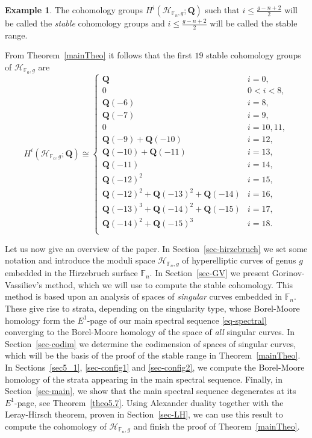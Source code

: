 \documentclass[10pt,a4paper,twoside]{amsart}
\theoremstyle{plain}
\theoremstyle{definition}
\newtheorem{exe}{Example}
\theoremstyle{remark}
\begin{document}
\begin{exe}
The cohomology groups $H^i(\mathcal{H}_{\mathbb{F}_n,g};\mathbf{Q})$ such that $i \leq \frac{g-n+2}{2}$ will be called the \emph{stable} cohomology groups and $i \leq \frac{g-n+2}{2}$ will be called the stable range. 

From Theorem~\ref{mainTheo} it follows that the first $19$ stable cohomology groups of $\mathcal{H}_{\mathbb{F}_0,g}$ are 
\begin{equation*}
H^i(\mathcal{H}_{\mathbb{F}_0,g};\mathbf{Q}) \cong \begin{cases}
\mathbf{Q}&i=0,\\
0&0<i<8,\\
\mathbf{Q}(-6)&i=8,\\
\mathbf{Q}(-7)&i=9,\\
0&i=10, 11,\\
\mathbf{Q}(-9)+\mathbf{Q}(-10)&i=12,\\
\mathbf{Q}(-10)+\mathbf{Q}(-11)&i=13,\\
\mathbf{Q}(-11)&i=14,\\
\mathbf{Q}(-12)^2&i=15,\\
\mathbf{Q}(-12)^2+\mathbf{Q}(-13)^2+\mathbf{Q}(-14)&i=16,\\
\mathbf{Q}(-13)^3+\mathbf{Q}(-14)^2+\mathbf{Q}(-15)&i=17,\\
\mathbf{Q}(-14)^2+\mathbf{Q}(-15)^3&i=18.\\
\end{cases}
\end{equation*}   
\end{exe}

Let us now give an overview of the paper. 
In Section~\ref{sec-hirzebruch} we set some notation and introduce the moduli space $\mathcal{H}_{\mathbb{F}_n,g}$ of hyperelliptic curves of genus $g$ embedded 
in the Hirzebruch surface $\mathbb{F}_n$. 
In Section~\ref{sec-GV} we present Gorinov-Vassiliev's method, which we will use to compute the stable cohomology. This method is based upon an analysis of spaces of \emph{singular} curves embedded in $\mathbb{F}_n$. These give rise to strata, depending on the singularity type, whose Borel-Moore homology form the $E^1$-page of our main spectral sequence \eqref{eq-spectral} converging to the Borel-Moore homology of the space of \emph{all} singular curves. 
In Section~\ref{sec-codim} we determine the codimension of spaces of singular curves, which will be the basis of the proof of the stable range in Theorem~\ref{mainTheo}. In Sections~\ref{sec5_1}, \ref{sec-config1} and \ref{sec-config2}, we compute the Borel-Moore homology of the strata appearing in the main spectral sequence. Finally, in Section~\ref{sec-main}, we show that the main spectral sequence degenerates at its $E^1$-page, see Theorem~\ref{theo5.7}. Using Alexander duality together with the Leray-Hirsch theorem, proven in Section~\ref{sec-LH}, we can use this result to compute the cohomology of $\mathcal{H}_{\mathbb{F}_n,g}$ and finish the proof of Theorem~\ref{mainTheo}. 
\end{document}
